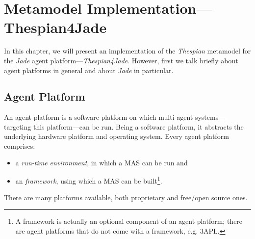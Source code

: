 
\chapter{Metamodel Implementation---Thespian4Jade}

In this chapter, we will present an implementation of the \textit{Thespian} metamodel for the \textit{Jade} agent platform---\textit{Thespian4Jade}.
However, first we talk briefly about agent platforms in general and about \textit{Jade} in particular. 

\section{Agent Platform}

An agent platform is a software platform on which multi-agent systems---targeting this platform---can be run.
Being a software platform, it abstracts the underlying hardware platform and operating system.
Every agent platform comprises:
\begin{itemize}
	\item a \textit{run-time environment}, in which a MAS can be run and
	\item an \textit{framework}, using which a MAS can be built\footnote{A framework is actually an optional component of an agent platform; there are agent platforms that do not come with a framework, e.g. 3APL.}.
\end{itemize}
There are many platforms available, both proprietary and free/open source ones.

